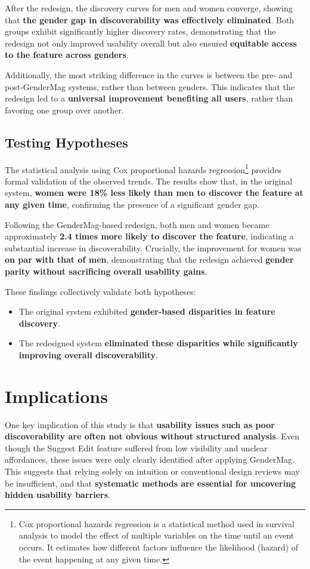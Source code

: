 After the redesign, the discovery curves for men and women converge, showing that \textbf{the gender gap in discoverability was effectively eliminated}. Both groups exhibit significantly higher discovery rates, demonstrating that the redesign not only improved usability overall but also ensured \textbf{equitable access to the feature across genders}.

Additionally, the most striking difference in the curves is between the pre- and post-GenderMag systems, rather than between genders. This indicates that the redesign led to a \textbf{universal improvement benefiting all users}, rather than favoring one group over another.

\subsection{Testing Hypotheses}
The statistical analysis using Cox proportional hazards regression\footnote{Cox proportional hazards regression is a statistical method used in survival analysis to model the effect of multiple variables on the time until an event occurs. It estimates how different factors influence the likelihood (hazard) of the event happening at any given time.
} provides formal validation of the observed trends. The results show that, in the original system, \textbf{women were 18\% less likely than men to discover the feature at any given time}, confirming the presence of a significant gender gap.

Following the GenderMag-based redesign, both men and women became approximately \textbf{2.4 times more likely to discover the feature}, indicating a substantial increase in discoverability. Crucially, the improvement for women was \textbf{on par with that of men}, demonstrating that the redesign achieved \textbf{gender parity without sacrificing overall usability gains}.

These findings collectively validate both hypotheses:

\begin{itemize}
    \item The original system exhibited \textbf{gender-based disparities in feature discovery}.
    \item The redesigned system \textbf{eliminated these disparities while significantly improving overall discoverability}.
\end{itemize}

\section{Implications}
One key implication of this study is that \textbf{usability issues such as poor discoverability are often not obvious without structured analysis}. Even though the Suggest Edit feature suffered from low visibility and unclear affordances, these issues were only clearly identified after applying GenderMag. This suggests that relying solely on intuition or conventional design reviews may be insufficient, and that \textbf{systematic methods are essential for uncovering hidden usability barriers}.


